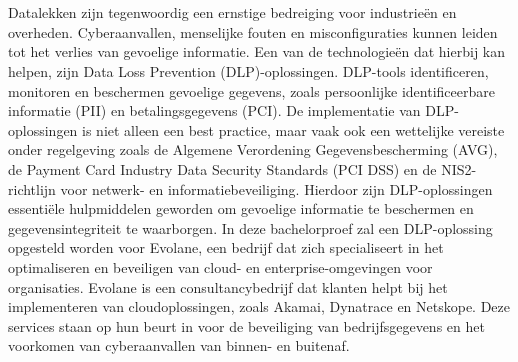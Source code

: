 
\chapter{}%
\label{ch:inleiding}


Datalekken zijn tegenwoordig een ernstige bedreiging voor industrieën en overheden. 
Cyberaanvallen, menselijke fouten en misconfiguraties kunnen leiden tot het verlies van gevoelige informatie. 
Een van de technologieën dat hierbij kan helpen, zijn Data Loss Prevention (DLP)-oplossingen.
DLP-tools identificeren, monitoren en beschermen gevoelige gegevens, zoals persoonlijke identificeerbare informatie (PII) en betalingsgegevens (PCI). 
De implementatie van DLP-oplossingen is niet alleen een best practice, maar vaak ook een wettelijke vereiste onder regelgeving zoals de 
Algemene Verordening Gegevensbescherming (AVG), de Payment Card Industry Data Security Standards (PCI DSS) en de NIS2-richtlijn voor netwerk- en informatiebeveiliging.
Hierdoor zijn DLP-oplossingen essentiële hulpmiddelen geworden om gevoelige informatie te beschermen en gegevensintegriteit te waarborgen. 
In deze bachelorproef zal een DLP-oplossing opgesteld worden voor Evolane, een bedrijf dat zich specialiseert in het optimaliseren en beveiligen van cloud- en enterprise-omgevingen voor organisaties. 
Evolane is een consultancybedrijf dat klanten helpt bij het implementeren van cloudoplossingen, zoals Akamai, Dynatrace en Netskope. 
Deze services staan op hun beurt in voor de beveiliging van bedrijfsgegevens en het voorkomen van cyberaanvallen van binnen- en buitenaf. 

